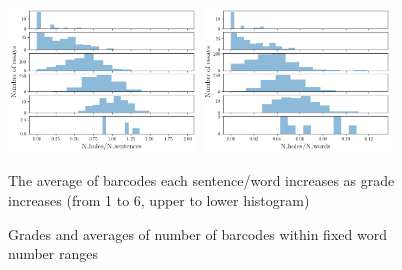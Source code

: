 \documentclass{beamer}
\begin{document}
\begin{frame}
\begin{figure}[H]
  \includegraphics[width=5cm]{gradesah1s.png}
  \includegraphics[width=5cm]{gradesah1w.png}
  \caption{The average of barcodes each sentence/word increases as grade increases (from 1 to 6, upper to lower histogram)}
  \label{fig:ads}
\end{figure}
\begin{figure}[H]
\begin{minipage}[c]{0.67\textwidth}
\scalebox{0.45}{}
\end{minipage}\hfill
\begin{minipage}[c]{0.3\textwidth}
\caption{Grades and averages of number of barcodes within fixed word number ranges}
\end{minipage}\hfill
\end{figure}

\end{frame}
\end{document}
